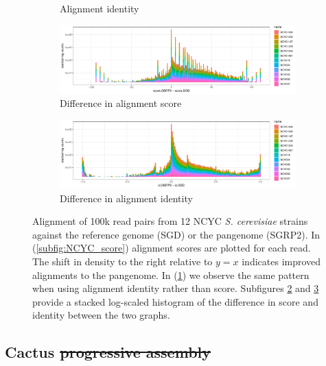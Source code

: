 \documentclass[a4paper,12pt,numbered,oneside]{Classes/PhDThesisPSnPDF}
\providecommand{\DIFaddtex}[1]{{\protect\color{blue}\uwave{#1}}} %
\providecommand{\DIFdeltex}[1]{{\protect\color{red}\sout{#1}}}                      %
\providecommand{\DIFaddbegin}{} %
\providecommand{\DIFaddend}{} %
\providecommand{\DIFdelbegin}{} %
\providecommand{\DIFdelend}{} %
\providecommand{\DIFadd}[1]{\texorpdfstring{\DIFaddtex{#1}}{#1}} %
\providecommand{\DIFdel}[1]{\texorpdfstring{\DIFdeltex{#1}}{}} %
\begin{document}
\begin{figure}[htbp!]
\begin{subfigure}[t]{0.49\textwidth}
    \caption{Alignment identity} \label{subfig:NCYC_identity}
  \end{subfigure}
  \begin{subfigure}[t]{1.0\textwidth}
    \includegraphics[width=1.0\textwidth]{Chapter3/Figs/NCYC_SGRP2_SGD_comparison_score_hist_color.pdf}
    \caption{Difference in alignment score} \label{subfig:NCYC_score_diff_hist}
  \end{subfigure}
  \begin{subfigure}[t]{1.0\textwidth}
    \includegraphics[width=1.0\textwidth]{Chapter3/Figs/NCYC_SGRP2_SGD_comparison_id_hist_color.pdf}
    \caption{Difference in alignment identity} \label{subfig:NCYC_id_diff_hist}
  \end{subfigure}
  \caption[Comparing alignment to the linear reference and SGRP2]{
    Alignment of 100k read pairs from 12 NCYC \emph{S. cerevisiae} strains against the reference genome (SGD) or the pangenome (SGRP2).
    In (\ref{subfig:NCYC_score}) alignment scores are plotted for each read.
    The shift in density to the right relative to $y=x$ indicates improved alignments to the pangenome.
    In (\ref{subfig:NCYC_identity}) we observe the same pattern when using alignment identity rather than score.
    Subfigures \ref{subfig:NCYC_score_diff_hist} and \ref{subfig:NCYC_id_diff_hist} provide a stacked log-scaled histogram of the difference in score and identity between the two graphs.
  }
\label{fig:NCYC_SGD_SGRP2}
\end{figure}

\subsection{Cactus \DIFdelbegin \DIFdel{progressive assembly}\DIFdelend \DIFaddbegin \DIFadd{yeast variation graph}\DIFaddend }
\label{sec:yeast_cactus}
\end{document}
